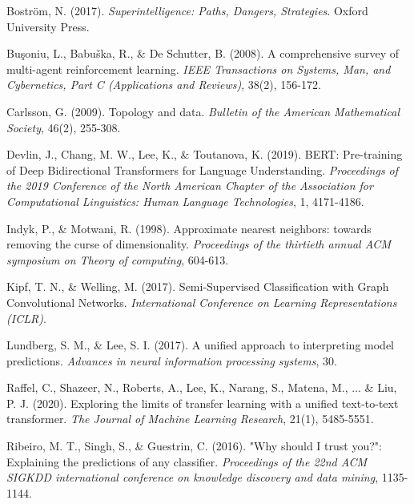 \documentclass[12pt, a4paper]{article}
\begin{document}

\begin{thebibliography}{1}

Boström, N. (2017).
\textit{Superintelligence: Paths, Dangers, Strategies}.
Oxford University Press.

Buşoniu, L., Babuška, R., \& De Schutter, B. (2008).
A comprehensive survey of multi-agent reinforcement learning.
\textit{IEEE Transactions on Systems, Man, and Cybernetics, Part C (Applications and Reviews)}, 38(2), 156-172.

Carlsson, G. (2009).
Topology and data.
\textit{Bulletin of the American Mathematical Society}, 46(2), 255-308.

Devlin, J., Chang, M. W., Lee, K., \& Toutanova, K. (2019).
BERT: Pre-training of Deep Bidirectional Transformers for Language Understanding.
\textit{Proceedings of the 2019 Conference of the North American Chapter of the Association for Computational Linguistics: Human Language Technologies}, 1, 4171-4186.

Indyk, P., \& Motwani, R. (1998).
Approximate nearest neighbors: towards removing the curse of dimensionality.
\textit{Proceedings of the thirtieth annual ACM symposium on Theory of computing}, 604-613.

Kipf, T. N., \& Welling, M. (2017).
Semi-Supervised Classification with Graph Convolutional Networks.
\textit{International Conference on Learning Representations (ICLR)}.

Lundberg, S. M., \& Lee, S. I. (2017).
A unified approach to interpreting model predictions.
\textit{Advances in neural information processing systems}, 30.

Raffel, C., Shazeer, N., Roberts, A., Lee, K., Narang, S., Matena, M., ... \& Liu, P. J. (2020).
Exploring the limits of transfer learning with a unified text-to-text transformer.
\textit{The Journal of Machine Learning Research}, 21(1), 5485-5551.

Ribeiro, M. T., Singh, S., \& Guestrin, C. (2016).
"Why should I trust you?": Explaining the predictions of any classifier.
\textit{Proceedings of the 22nd ACM SIGKDD international conference on knowledge discovery and data mining}, 1135-1144.

\end{thebibliography}
\end{document}
